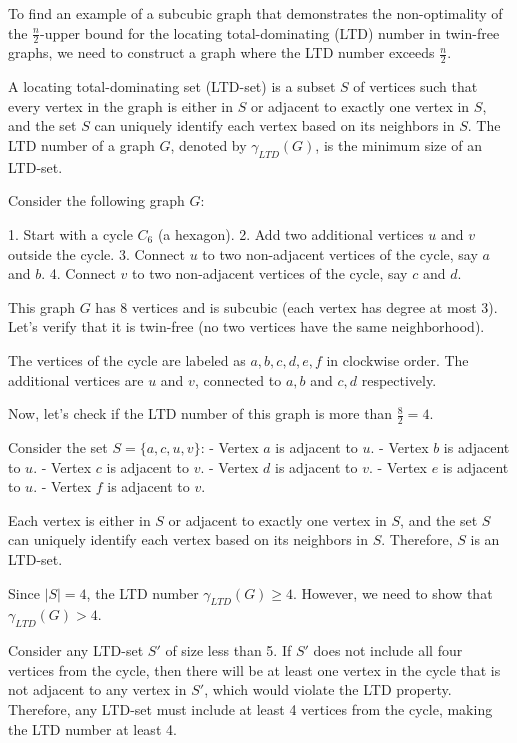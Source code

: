 To find an example of a subcubic graph that demonstrates the non-optimality of the \(\frac{n}{2}\)-upper bound for the locating total-dominating (LTD) number in twin-free graphs, we need to construct a graph where the LTD number exceeds \(\frac{n}{2}\).

A locating total-dominating set (LTD-set) is a subset \(S\) of vertices such that every vertex in the graph is either in \(S\) or adjacent to exactly one vertex in \(S\), and the set \(S\) can uniquely identify each vertex based on its neighbors in \(S\). The LTD number of a graph \(G\), denoted by \(\gamma_{LTD}(G)\), is the minimum size of an LTD-set.

Consider the following graph \(G\):

1. Start with a cycle \(C_6\) (a hexagon).
2. Add two additional vertices \(u\) and \(v\) outside the cycle.
3. Connect \(u\) to two non-adjacent vertices of the cycle, say \(a\) and \(b\).
4. Connect \(v\) to two non-adjacent vertices of the cycle, say \(c\) and \(d\).

This graph \(G\) has 8 vertices and is subcubic (each vertex has degree at most 3). Let's verify that it is twin-free (no two vertices have the same neighborhood).

The vertices of the cycle are labeled as \(a, b, c, d, e, f\) in clockwise order. The additional vertices are \(u\) and \(v\), connected to \(a, b\) and \(c, d\) respectively.

Now, let's check if the LTD number of this graph is more than \(\frac{8}{2} = 4\).

Consider the set \(S = \{a, c, u, v\}\):
- Vertex \(a\) is adjacent to \(u\).
- Vertex \(b\) is adjacent to \(u\).
- Vertex \(c\) is adjacent to \(v\).
- Vertex \(d\) is adjacent to \(v\).
- Vertex \(e\) is adjacent to \(u\).
- Vertex \(f\) is adjacent to \(v\).

Each vertex is either in \(S\) or adjacent to exactly one vertex in \(S\), and the set \(S\) can uniquely identify each vertex based on its neighbors in \(S\). Therefore, \(S\) is an LTD-set.

Since \(|S| = 4\), the LTD number \(\gamma_{LTD}(G) \geq 4\). However, we need to show that \(\gamma_{LTD}(G) > 4\).

Consider any LTD-set \(S'\) of size less than 5. If \(S'\) does not include all four vertices from the cycle, then there will be at least one vertex in the cycle that is not adjacent to any vertex in \(S'\), which would violate the LTD property. Therefore, any LTD-set must include at least 4 vertices from the cycle, making the LTD number at least 4.

